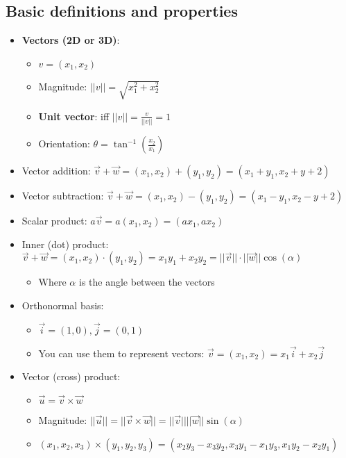 \subsection{Basic definitions and properties}
\begin{itemize}
\subsubsection{Vectors}
	\item \textbf{Vectors (2D or 3D)}:
	\begin{itemize}
		\item $v=(x_1, x_2)$
		\item Magnitude: $||v||=\sqrt{x_1^{2}+x_2^{2}}$
		\item \textbf{Unit vector}: iff $||v||=\frac{v}{||v||}=1$
		\item Orientation: $\theta = \tan^{-1}\left(\frac{x_2}{x_1}\right)$
	\end{itemize}
	\item Vector addition: $\vec{v}+\vec{w}=(x_1, x_2)+(y_1, y_2)=(x_1+y_1, x_2+y+2)$
	\item Vector subtraction: $\vec{v}+\vec{w}=(x_1, x_2)-(y_1, y_2)=(x_1-y_1, x_2-y+2)$
	\item Scalar product: $a\vec{v}=a(x_1, x_2)=(ax_1, ax_2)$
	\item Inner (dot) product: $\vec{v}+\vec{w}=(x_1, x_2)\cdot(y_1, y_2)=x_1y_1+x_2y_2=||\vec{v}||\cdot||\vec{w}||\cos(\alpha)$
	\begin{itemize}
		\item Where $\alpha$ is the angle between the vectors
	\end{itemize}
	\item Orthonormal basis:
	\begin{itemize}
		\item $\vec{i}=(1,0), \vec{j}=(0,1)$
		\item You can use them to represent vectors: $\vec{v}=(x_1, x_2)=x_1\vec{i}+x_2\vec{j}$
	\end{itemize}
	\item Vector (cross) product:
	\begin{itemize}
		\item $\vec{u}=\vec{v}\times\vec{w}$
		\item Magnitude: $||\vec{u}||=||\vec{v}\times\vec{w}||=||\vec{v}||||\vec{w}||\sin(\alpha)$
		\item $(x_1, x_2, x_3)\times(y_1, y_2, y_3)=(x_2y_3-x_3y_2, x_3y_1-x_1y_3, x_1y_2-x_2y_1)$
	\end{itemize}

\end{itemize}
